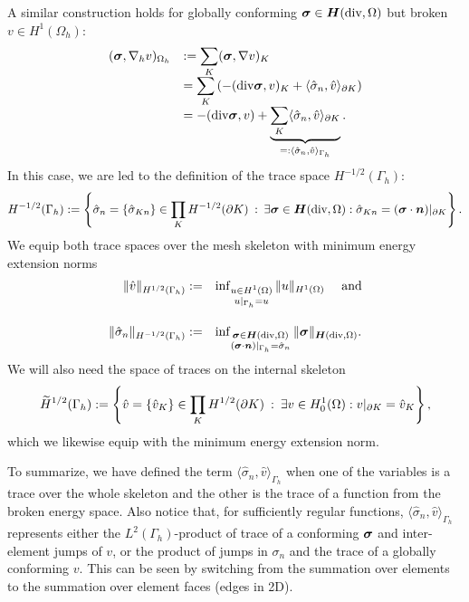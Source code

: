 A similar construction holds for globally conforming $\bfsig \in \bfH(\text{div},\Omega)$
but broken $v \in H^1(\Omega_h)$:
\[
\begin{array}{ll}
(\bfsig, \bfnab_h v)_{\Omega_h} & := \ds \sum_K (\bfsig, \bfnab v)_K \\[8pt]
& \ds = \sum_K \left( - (\text{div} \bfsig, v)_K + \langle{\hat{\sigma}}_n,{\hat{v}}\rangle_{\ptl K} \right) \\[8pt]
& \ds = -(\text{div} \bfsig,v) + \underbrace{\sum_K \langle{\hat{\sigma}}_n,{\hat{v}}\rangle_{\ptl K}}_{=: \langle{\hat{\sigma}}_n, {\hat{v}}\rangle_{\Gamma_h}}.
\end{array}
\]
In this case, we are led to the definition of the trace space $H^{-1/2}(\Gamma_h)$:
\[
H^{-1/2}(\Gamma_h) := \left\{ {\hat{\sigma}}_n = \{ {\hat{\sigma}}_{Kn} \}\in \prod_K H^{-1/2}(\ptl K) \: : \: \exists \bfsig \in \bfH(\text{div},\Omega)
: {\hat{\sigma}}_{Kn} = (\bfsig \cdot \bfn)\vert_{\ptl K} \right\}.
\]
We equip both trace spaces over the mesh skeleton with minimum energy extension norms
\[
\begin{array}{rl}
\Vert {\hat{v}} \Vert_{H^{1/2}(\Gamma_h)} := \ds &\inf_{\substack{{u} \in H^1(\Omega)\\ {u}\vert_{\Gamma_h} = u}} 
\Vert {u} \Vert_{H^1(\Omega)} \quad \text{ and} \\[24pt]
\Vert {\hat{\sigma}}_n \Vert_{H^{-1/2}(\Gamma_h)} := \ds &\inf_{\substack{\text{\bfsig} \in \text{\bfH}(\text{div},\Omega)\\
(\text{\bfsig} \cdot \text{\bfn})\vert_{\Gamma_h} = {\hat{\sigma}}_n}}
\Vert \bfsig \Vert_{\text{$\bfH$}(\text{div},\Omega)}.
\end{array}
\]
We will also need the space of traces on the internal skeleton
\[
\tilde{H}^{1/2}(\Gamma_h) := \left\{ {\hat{v}} = \{{\hat{v}}_K \} \in  \prod_K H^{1/2}(\ptl K) \: : \: \exists {v} \in H^1_0(\Omega) : {v}\vert_{\ptl K} = {\hat{v}}_K \right\},
\]
which we likewise equip with the minimum energy extension norm.



To summarize, we have defined the term $\langle{\hat{\sigma}}_n,{\hat{v}}\rangle_{\Gamma_h}$ when
one of the variables is a trace over the whole skeleton and
the other is the trace of a function from the broken energy
space. Also notice that, for sufficiently regular functions, 
$\langle{\hat{\sigma}}_n,{\hat{v}}\rangle_{\Gamma_h}$ represents either the $L^2(\Gamma_h)$-product
of trace of a conforming $\bfsig$ and inter-element jumps of $v$, or the product
of jumps in $\sigma_n$ and the trace of a globally conforming $v$. This
can be seen by switching from the summation over elements to the
summation over element faces (edges in 2D).


